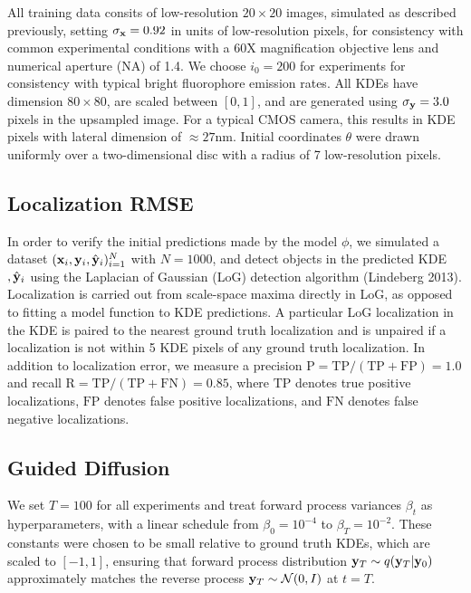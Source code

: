 \documentclass{article}
\begin{document}
All training data consits of low-resolution $20\times 20$ images, simulated as described previously, setting $\sigma_{\bold{x}}=0.92$ in units of low-resolution pixels, for consistency with common experimental conditions with a 60X magnification objective lens and numerical aperture (NA) of 1.4. We choose $i_{0}=200$ for experiments for consistency with typical bright fluorophore emission rates. All KDEs have dimension $80\times 80$, are scaled between $[0,1]$, and are generated using $\sigma_{\bold{y}}=3.0$ pixels in the upsampled image. For a typical CMOS camera, this results in KDE pixels with lateral dimension of $\approx 27\mathrm{nm}$. Initial coordinates $\theta$ were drawn uniformly over a two-dimensional disc with a radius of 7 low-resolution pixels.

\subsection{Localization RMSE}

In order to verify the initial predictions made by the model $\phi$, we simulated a dataset $(\bold{x}_i,\bold{y}_i,\hat{\bold{y}}_{i})_{i=1}^{N}$ with $N=1000$, and  detect objects in the predicted KDE $,\hat{\bold{y}}_{i}$ using the Laplacian of Gaussian (LoG) detection algorithm (Lindeberg 2013). Localization is carried out from scale-space maxima directly in LoG, as opposed to fitting a model function to KDE predictions. A particular LoG localization in the KDE is paired to the nearest ground truth localization and is unpaired if a localization is not within 5 KDE pixels of any ground truth localization. In addition to localization error, we measure a precision $\mathrm{P = TP/(TP + FP)} = 1.0$ and recall $\mathrm{R = TP/(TP + FN)} = 0.85$, where $\mathrm{TP}$ denotes true positive localizations, $\mathrm{FP}$ denotes false positive localizations, and $\mathrm{FN}$ denotes false negative localizations.

\subsection{Guided Diffusion}

We set $T = 100$ for all experiments and treat forward process variances $\beta_{t}$ as hyperparameters, with a linear schedule from $\beta_{0}=10^{-4}$ to $\beta_{T}=10^{-2}$.
These constants were chosen to be small relative to ground truth KDEs, which are scaled to $[-1,1]$, ensuring that forward process distribution $\bold{y}_{T}\sim q(\bold{y}_{T}|\bold{y}_{0})$ approximately matches the reverse process $\bold{y}_T\sim \mathcal{N}(0, I)$ at $t=T$.
\end{document}
